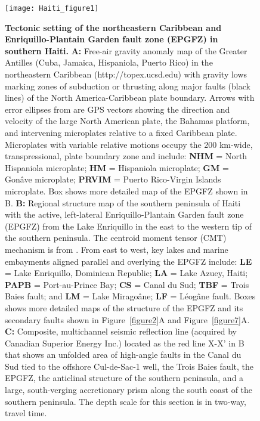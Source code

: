 \documentclass[linenumbers,draft]{agujournal}
\begin{document}
\begin{figure}
\centering
\texttt{[image: Haiti\_figure1]}
\caption{\textbf{Tectonic setting of the northeastern Caribbean and Enriquillo-Plantain Garden fault zone (EPGFZ) in southern Haiti.} \textbf{A:}
Free-air gravity anomaly map of the Greater Antilles (Cuba, Jamaica, Hispaniola, Puerto Rico) in the northeastern Caribbean (http://topex.ucsd.edu) with gravity lows marking zones of subduction or thrusting along major faults (black lines) of the North America-Caribbean plate boundary. Arrows with error ellipses from \citet{calais2010transpressional} are GPS vectors showing the direction and velocity of the large North American plate, the Bahamas platform, and intervening microplates relative to a fixed Caribbean plate. Microplates with variable relative motions occupy the 200 km-wide, transpressional, plate boundary zone and include: \textbf{NHM} = North Hispaniola microplate; \textbf{HM} = Hispaniola microplate; \textbf{GM} = Gon\^ave microplate; \textbf{PRVIM} = Puerto Rico-Virgin Islands microplate. Box shows more detailed map of the EPGFZ shown in B. \textbf{B:} Regional structure map of the southern peninsula of Haiti with the active, left-lateral Enriquillo-Plantain Garden fault zone (EPGFZ) from the Lake Enriquillo in the east to the western tip of the southern peninsula. The centroid moment tensor (CMT) mechanism is from \citet{douilly2013crustal}. From east to west, key lakes and marine embayments aligned parallel and overlying the EPGFZ include: \textbf{LE} = Lake Enriquillo, Dominican Republic; \textbf{LA} = Lake Azuey, Haiti; \textbf{PAPB} = Port-au-Prince Bay; \textbf{CS }= Canal du Sud; \textbf{TBF }= Trois Baies fault; and \textbf{LM} = Lake Mirago\^ane; \textbf{LF} = L\'eog\^ane fault. Boxes shows more detailed maps of the structure of the EPGFZ and its secondary faults shown in Figure~\ref{figure2}A and Figure~\ref{figure7}A. \textbf{C:} Composite, multichannel seismic reflection line (acquired by Canadian Superior Energy Inc.) located as the red line X-X' in B that shows an unfolded area of high-angle faults in the Canal du Sud tied to the offshore Cul-de-Sac-1 well, the Trois Baies fault, the EPGFZ, the anticlinal structure of the southern peninsula, and a large, south-verging accretionary prism along the south coast of the southern peninsula. The depth scale for this section is in two-way, travel time.}
\label{figure1}
\end{figure}
\end{document}
